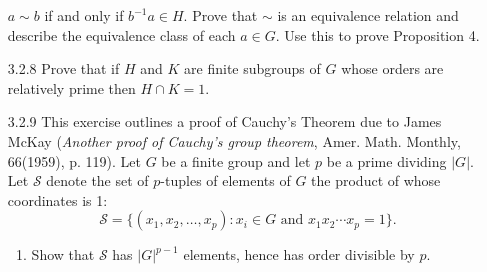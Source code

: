 \begin{enumerate}
                  $a \sim b$ if and only if $b^{-1}a \in H$. Prove that $\sim$
                  is an equivalence relation and describe the equivalence class
                  of each $a \in G$. Use this to prove Proposition 4.
   \item[3.2.8]   Prove that if $H$ and $K$ are finite subgroups of $G$ whose
                  orders are relatively prime then $H \cap K = 1$.
   \item[3.2.9]   This exercise outlines a proof of Cauchy's Theorem due to
                  James McKay (\textit{Another proof of Cauchy's group theorem},
                  Amer. Math. Monthly, 66(1959), p. 119). Let $G$ be a finite
                  group and let $p$ be a prime dividing $|G|$. Let $\mathcal{S}$
                  denote the set of $p$-tuples of elements of $G$ the product of
                  whose coordinates is 1:
                  $$\mathcal{S} = \{(x_1, x_2, \ldots, x_p) : x_i \in G
                    \text{ and } x_1x_2 \cdots x_p = 1\}.$$
                  \begin{enumerate}
                     \item Show that $\mathcal{S}$ has $|G|^{p-1}$ elements,
                           hence has order divisible by $p$.


\end{enumerate}
\end{enumerate}
